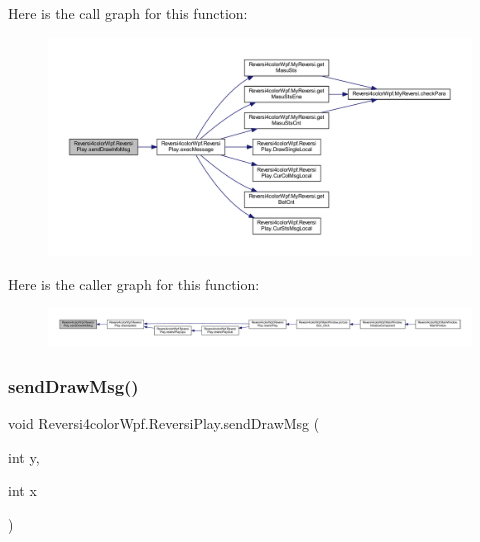 Here is the call graph for this function\+:
\nopagebreak
\begin{figure}[H]
\begin{center}
\leavevmode
\includegraphics[width=350pt]{class_reversi4color_wpf_1_1_reversi_play_a503f1a56ac7547ebfb347c31ff5b7e15_cgraph}
\end{center}
\end{figure}
Here is the caller graph for this function\+:
\nopagebreak
\begin{figure}[H]
\begin{center}
\leavevmode
\includegraphics[width=350pt]{class_reversi4color_wpf_1_1_reversi_play_a503f1a56ac7547ebfb347c31ff5b7e15_icgraph}
\end{center}
\end{figure}
\mbox{\label{class_reversi4color_wpf_1_1_reversi_play_a31094f14117da5411e4616e7935ff67b}} 
\subsubsection{\texorpdfstring{send\+Draw\+Msg()}{sendDrawMsg()}}
{\footnotesize\ttfamily void Reversi4color\+Wpf.\+Reversi\+Play.\+send\+Draw\+Msg (\begin{DoxyParamCaption}\item[{int}]{y,  }\item[{int}]{x }\end{DoxyParamCaption})}



